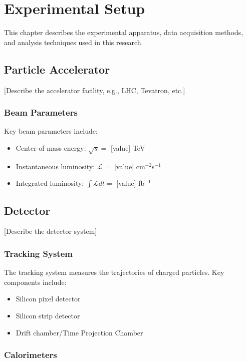 \chapter{Experimental Setup}
\label{ch:experiment}

This chapter describes the experimental apparatus, data acquisition methods, and analysis techniques used in this research.

\section{Particle Accelerator}

[Describe the accelerator facility, e.g., LHC, Tevatron, etc.]

\subsection{Beam Parameters}

Key beam parameters include:
\begin{itemize}
  \item Center-of-mass energy: $\sqrt{s} = $ [value] TeV
  \item Instantaneous luminosity: $\mathcal{L} = $ [value] cm$^{-2}$s$^{-1}$
  \item Integrated luminosity: $\int \mathcal{L} dt = $ [value] fb$^{-1}$
\end{itemize}

\section{Detector}

[Describe the detector system]

\subsection{Tracking System}

The tracking system measures the trajectories of charged particles. Key components include:
\begin{itemize}
  \item Silicon pixel detector
  \item Silicon strip detector
  \item Drift chamber/Time Projection Chamber
\end{itemize}

\subsection{Calorimeters}

